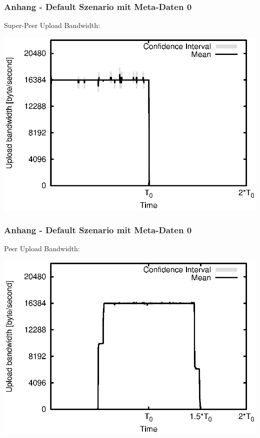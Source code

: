 \begin{frame}
  \frametitle{Anhang - Default Szenario mit Meta-Daten 0}
  Super-Peer Upload Bandwidth:
  
  \begin{center}
    \includegraphics[width=1\textwidth]{fig/plots/scenario_5_meta_data_0/plots/GeneratedMeanCurrentSuperSeederUploadBandwidth.csv.eps}
  \end{center}
\end{frame}


\begin{frame}
  \frametitle{Anhang - Default Szenario mit Meta-Daten 0}
  Peer Upload Bandwidth:
  
  \begin{center}
    \includegraphics[width=1\textwidth]{fig/plots/scenario_5_meta_data_0/plots/GeneratedMeanCurrentUploadBandwidth.csv.eps}
  \end{center}
\end{frame}


